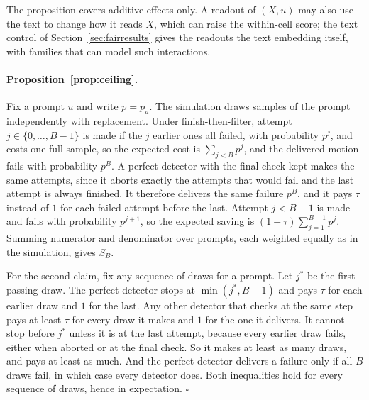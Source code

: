 The proposition covers additive effects only. A readout of $(X, u)$ may also use the text to change how it reads $X$, which can raise the within-cell score; the text control of Section~\ref{sec:fairresults} gives the readouts the text embedding itself, with families that can model such interactions.

\paragraph{Proposition~\ref{prop:ceiling}.} Fix a prompt $u$ and write $p = p_u$. The simulation draws samples of the prompt independently with replacement. Under finish-then-filter, attempt $j \in \{0, \dots, B-1\}$ is made if the $j$ earlier ones all failed, with probability $p^j$, and costs one full sample, so the expected cost is $\sum_{j<B} p^j$, and the delivered motion fails with probability $p^B$. A perfect detector with the final check kept makes the same attempts, since it aborts exactly the attempts that would fail and the last attempt is always finished. It therefore delivers the same failure $p^B$, and it pays $\tau$ instead of $1$ for each failed attempt before the last. Attempt $j < B-1$ is made and fails with probability $p^{j+1}$, so the expected saving is $(1-\tau)\sum_{j=1}^{B-1} p^j$. Summing numerator and denominator over prompts, each weighted equally as in the simulation, gives $S_B$.

For the second claim, fix any sequence of draws for a prompt. Let $j^*$ be the first passing draw. The perfect detector stops at $\min(j^*, B-1)$ and pays $\tau$ for each earlier draw and $1$ for the last. Any other detector that checks at the same step pays at least $\tau$ for every draw it makes and $1$ for the one it delivers. It cannot stop before $j^*$ unless it is at the last attempt, because every earlier draw fails, either when aborted or at the final check. So it makes at least as many draws, and pays at least as much. And the perfect detector delivers a failure only if all $B$ draws fail, in which case every detector does. Both inequalities hold for every sequence of draws, hence in expectation. $\square$

